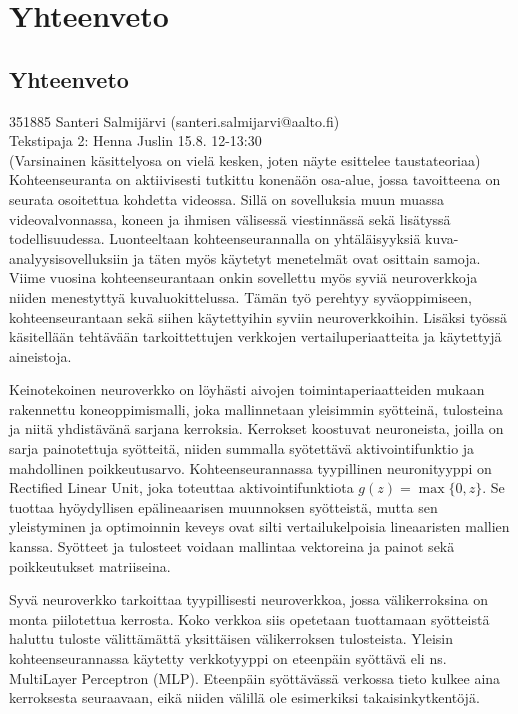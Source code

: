 \section{Yhteenveto}

\clearpage

\setcounter{subsection}{-1}
\let\oldsubsection=\thesubsection
\renewcommand{\thesubsection}{\thesection}

\subsection{Yhteenveto}

351885 Santeri Salmijärvi (santeri.salmijarvi@aalto.fi)\\
Tekstipaja 2: Henna Juslin 15.8. 12-13:30\\
(Varsinainen käsittelyosa on vielä kesken, joten näyte esittelee taustateoriaa)\\
Kohteenseuranta on aktiivisesti tutkittu konenäön osa-alue, jossa tavoitteena on seurata
osoitettua kohdetta videossa. Sillä on sovelluksia muun muassa videovalvonnassa, koneen ja
ihmisen välisessä viestinnässä sekä lisätyssä todellisuudessa. Luonteeltaan kohteenseurannalla
on yhtäläisyyksiä kuva-analyysisovelluksiin ja täten myös käytetyt menetelmät ovat osittain
samoja. Viime vuosina kohteenseurantaan onkin sovellettu myös syviä neuroverkkoja niiden
menestyttyä kuvaluokittelussa. Tämän työ perehtyy syväoppimiseen, kohteenseurantaan sekä
siihen käytettyihin syviin neuroverkkoihin. Lisäksi työssä käsitellään tehtävään tarkoittettujen
verkkojen vertailuperiaatteita ja käytettyjä aineistoja.

Keinotekoinen neuroverkko on löyhästi aivojen toimintaperiaatteiden mukaan rakennettu
koneoppimismalli, joka mallinnetaan yleisimmin syötteinä, tulosteina ja niitä yhdistävänä
sarjana kerroksia. Kerrokset koostuvat neuroneista, joilla on sarja painotettuja syötteitä,
niiden summalla syötettävä aktivointifunktio ja mahdollinen poikkeutusarvo. Kohteenseurannassa
tyypillinen neuronityyppi on Rectified Linear Unit, joka toteuttaa aktivointifunktiota
$g (z) = \max\{0,z\}$. Se tuottaa hyöydyllisen epälineaarisen muunnoksen syötteistä, mutta
sen yleistyminen ja optimoinnin keveys ovat silti vertailukelpoisia lineaaristen mallien kanssa.
Syötteet ja tulosteet voidaan mallintaa vektoreina ja painot sekä poikkeutukset matriiseina.

Syvä neuroverkko tarkoittaa tyypillisesti neuroverkkoa, jossa välikerroksina on monta
piilotettua kerrosta. Koko verkkoa siis opetetaan tuottamaan syötteistä haluttu tuloste
välittämättä yksittäisen välikerroksen tulosteista. Yleisin kohteenseurannassa käytetty
verkkotyyppi on eteenpäin syöttävä eli ns. MultiLayer Perceptron (MLP). Eteenpäin syöttävässä
verkossa tieto kulkee aina kerroksesta seuraavaan, eikä niiden välillä ole esimerkiksi
takaisinkytkentöjä.

